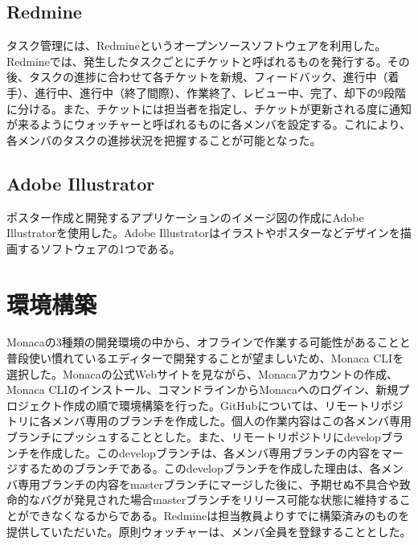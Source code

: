\subsection{Redmine}%
タスク管理には、Redmineというオープンソースソフトウェアを利用した。Redmineでは、発生したタスクごとにチケットと呼ばれるものを発行する。その後、タスクの進捗に合わせて各チケットを新規、フィードバック、進行中（着手）、進行中、進行中（終了間際）、作業終了、レビュー中、完了、却下の9段階に分ける。また、チケットには担当者を指定し、チケットが更新される度に通知が来るようにウォッチャーと呼ばれるものに各メンバを設定する。これにより、各メンバのタスクの進捗状況を把握することが可能となった。


\subsection{Adobe Illustrator}%
ポスター作成と開発するアプリケーションのイメージ図の作成にAdobe Illustratorを使用した。Adobe Illustratorはイラストやポスターなどデザインを描画するソフトウェアの1つである。


\section{環境構築}%
Monacaの3種類の開発環境の中から、オフラインで作業する可能性があることと普段使い慣れているエディターで開発することが望ましいため、Monaca CLIを選択した。Monacaの公式Webサイト\cite{tutorial_monaca_CLI}を見ながら、Monacaアカウントの作成、Monaca CLIのインストール、コマンドラインからMonacaへのログイン、新規プロジェクト作成の順で環境構築を行った。GitHubについては、リモートリポジトリに各メンバ専用のブランチを作成した。個人の作業内容はこの各メンバ専用ブランチにプッシュすることとした。また、リモートリポジトリにdevelopブランチを作成した。このdevelopブランチは、各メンバ専用ブランチの内容をマージするためのブランチである。このdevelopブランチを作成した理由は、各メンバ専用ブランチの内容をmasterブランチにマージした後に、予期せぬ不具合や致命的なバグが発見された場合masterブランチをリリース可能な状態に維持することができなくなるからである。Redmineは担当教員よりすでに構築済みのものを提供していただいた。原則ウォッチャー\cite{Redmine}は、メンバ全員を登録することとした。

